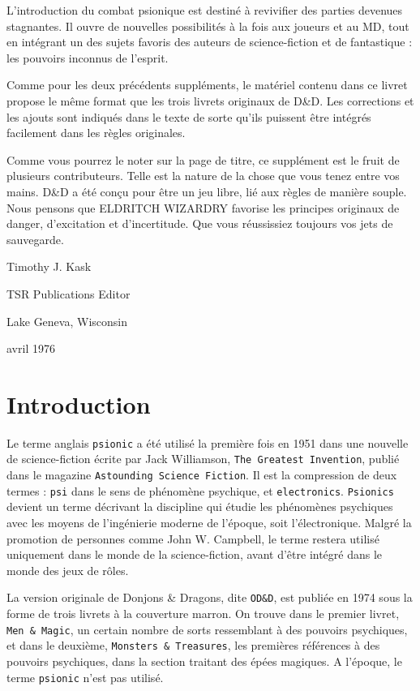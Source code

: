 \documentclass[11pt]{article}
\begin{document}
L'introduction du combat psionique est destiné à revivifier des parties devenues stagnantes. Il ouvre de nouvelles possibilités à la fois aux joueurs et au MD, tout en intégrant un des sujets favoris des auteurs de science-fiction et de fantastique : les pouvoirs inconnus de l'esprit.

Comme pour les deux précédents suppléments, le matériel contenu dans ce livret propose le même format que les trois livrets originaux de D\&D. Les corrections et les ajouts sont indiqués dans le texte de sorte qu'ils puissent être intégrés facilement dans les règles originales.

Comme vous pourrez le noter sur la page de titre, ce supplément est le fruit de plusieurs contributeurs. Telle est la nature de la chose que vous tenez entre vos mains. D\&D a été conçu pour être un jeu libre, lié aux règles de manière souple. Nous pensons que ELDRITCH WIZARDRY favorise les principes originaux de danger, d'excitation et d'incertitude. Que vous réussissiez toujours vos jets de sauvegarde.

\vspace{1cm}

\noindent Timothy J. Kask

\noindent TSR Publications Editor

\noindent Lake Geneva, Wisconsin

 avril 1976

\newpage
\phantom{-}
\newpage

\section*{Introduction}

Le terme anglais \texttt{psionic} a été utilisé la première fois en 1951 dans une nouvelle de science-fiction écrite par Jack Williamson, \texttt{The Greatest Invention}, publié dans le magazine \texttt{Astounding Science Fiction}. Il est la compression de deux termes : \texttt{psi} dans le sens de phénomène psychique, et \texttt{electronics}. \texttt{Psionics} devient un terme décrivant la discipline qui étudie les phénomènes psychiques avec les moyens de l'ingénierie moderne de l'époque, soit l'électronique. Malgré la promotion de personnes comme John W. Campbell, le terme restera utilisé uniquement dans le monde de la science-fiction, avant d'être intégré dans le monde des jeux de rôles.

La version originale de Donjons \& Dragons, dite \texttt{OD\&D}, est publiée en 1974 sous la forme de trois livrets à la couverture marron. On trouve dans le premier livret, \texttt{Men \& Magic}, un certain nombre de sorts ressemblant à des pouvoirs psychiques, et dans le deuxième, \texttt{Monsters \& Treasures}, les premières références à des pouvoirs psychiques, dans la section traitant des épées magiques. A l'époque, le terme \texttt{psionic} n'est pas utilisé.
\end{document}
